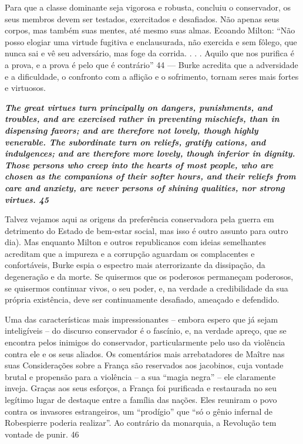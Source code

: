  
\par
 
Para que a classe dominante seja vigorosa e robusta, concluiu o conservador, os seus membros devem ser testados, exercitados e desafiados. Não apenas seus corpos, mas também suas mentes, até mesmo suas almas. Ecoando Milton: “Não posso elogiar uma virtude fugitiva e enclausurada, não exercida e sem fôlego, que nunca sai e vê seu adversário, mas foge da corrida. . . . Aquilo que nos purifica é a prova, e a prova é pelo que é contrário”
 {\color{blue} 44}  
— Burke acredita que a adversidade e a dificuldade, o confronto com a aflição e o sofrimento, tornam seres mais fortes e virtuosos.
 
\par
 

 \textbf{\textit{The great virtues turn principally on dangers, punishments, and troubles, and are exercised rather in preventing mischiefs, than in dispensing favors; and are therefore not lovely, though highly venerable. The subordinate turn on reliefs, gratify cations, and indulgences; and are therefore more lovely, though inferior in dignity. Those persons who creep into the hearts of most people, who are chosen as the companions of their softer hours, and their reliefs from care and anxiety, are never persons of shining qualities, nor strong virtues. {{\color{blue} 45} } } }  
 
 
\par
 
Talvez vejamos aqui as origens da preferência conservadora pela guerra em detrimento do Estado de bem-estar social, mas isso é outro assunto para outro dia). Mas enquanto Milton e outros republicanos com ideias semelhantes acreditam que a impureza e a corrupção aguardam os complacentes e confortáveis, Burke espia o espectro mais aterrorizante da dissipação, da degeneração e da morte. Se quisermos que os poderosos permaneçam poderosos, se quisermos continuar vivos, o seu poder, e, na verdade a credibilidade da sua própria existência, deve ser continuamente desafiado, ameaçado e defendido.
 
\par
 
Uma das características mais impressionantes – embora espero que já sejam inteligíveis – do discurso conservador é o fascínio, e, na verdade apreço, que se encontra pelos inimigos do conservador, particularmente pelo uso da violência contra ele e os seus aliados. Os comentários mais arrebatadores de Maître nas suas Considerações sobre a França são reservados aos jacobinos, cuja vontade brutal e propensão para a violência – a sua “magia negra” – ele claramente inveja. Graças aos seus esforços, a França foi purificada e restaurada no seu legítimo lugar de destaque entre a família das nações. Eles reuniram o povo contra os invasores estrangeiros, um “prodígio” que “só o gênio infernal de Robespierre poderia realizar”. Ao contrário da monarquia, a Revolução tem vontade de punir.
 {\color{blue} 46}  

